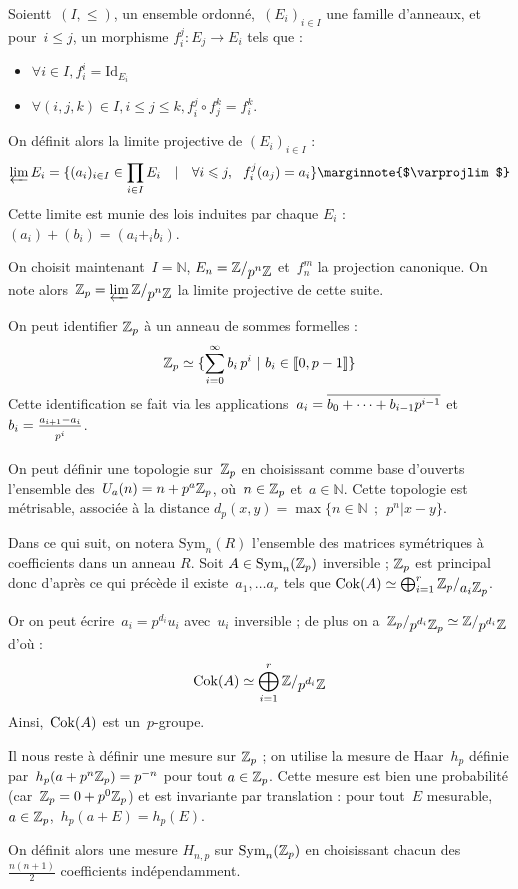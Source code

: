 \begin{defi}
Soientt~$(I, \leq)$, un ensemble ordonné,~$(E_i)_{i\in I}$ une famille d'anneaux, et pour~$i\leq j$, un morphisme $f_i^j : E_j \to E_i$ tels que :
\begin{itemize}
\item $\forall i\in I, f_i^i = \text{Id}_{E_i}$
\item $\forall (i,j,k)\in I, i\leq j\leq k, f_i^j \circ f_j^k = f_i^k$.
\end{itemize}
On définit alors la limite projective de $(E_i)_{i\in I}$ :
\[ \varprojlim{E_i} = \{(a_i)_{i\in I}\in \prod_{i\in I}{E_i}\quad |\quad\forall i\leq j,\ \  f_i^j(a_j) = a_i \} \text{\marginnote{$\varprojlim$}} \]
Cette limite est munie des lois induites par chaque $E_i$ : $(a_i) + (b_i) = (a_i +_i b_i)$.
\end{defi}

On choisit maintenant~$I = \mathbb N$, $E_n = \quotient{\mathbb{Z}}{p^n \mathbb Z}$ et~$f_n^m$ la projection canonique. On note alors~$\Zp = \varprojlim{\quotient{\mathbb Z}{p^n\mathbb Z}}$ la limite projective de cette suite. \marginnote{$\Zp$}

\begin{rem}
On peut identifier $\Zp$ à un anneau de sommes formelles :
\[ \mathbb{Z}_p \simeq \{ \sum_{i=0}^\infty{b_i\,p^i}\   |\  b_i\in\llbracket0, p-1 \rrbracket\} \]
Cette identification se fait via les applications~$a_i = \overline{\strut b_0+\dots+b_{i-1}p^{i-1}}$ et~$b_i = \frac{a_{i+1}-a_i}{\strut p^i}$.
\end{rem}

On peut définir une topologie sur~$\Zp$ en choisissant comme base d'ouverts l'ensemble des~$U_a(n) = n + p^a\mathbb{Z}_p$, où~$n\in\mathbb{Z}_p$ et~$a\in\mathbb N$. Cette topologie est métrisable, associée à la distance $d_p(x,y) = \max\{n\in\mathbb N \ \ ;\  \ p^n | x-y\}$.

\vspace{0.2cm}
Dans ce qui suit, on notera $\text{Sym}_n(R)$ l'ensemble des matrices symétriques à coefficients dans un anneau $R$.
Soit $A \in \operatorname{Sym}_n(\mathbb{Z}_p)$ inversible ; $\Zp$ est principal donc d'après ce qui précède il existe~$a_1, \dots a_r$ tels que $\Cok(A) \simeq \bigoplus_{i=1}^r{\quotient{\Zp}{a_i\Zp}}$.

Or on peut écrire~$a_i = p^{d_i}u_i$ avec~$u_i$ inversible ; de plus on a~$\quotient{\Zp}{p^{d_i}\Zp} \simeq \quotient{\mathbb Z}{p^{d_i}\mathbb Z}$ d'où :
\[ \Cok(A) \simeq \bigoplus_{i=1}^r \quotient{\mathbb Z}{p^{d_i}\mathbb Z} \]
Ainsi,~$\operatorname{Cok}(A)$ est un~$p$-groupe.

Il nous reste à définir une mesure sur $\Zp$ ; on utilise la mesure de Haar~$h_p$ définie par~$h_p(a+p^n\mathbb{Z}_p) = p^{-n}$ pour tout $a\in\mathbb{Z}_p$.
Cette mesure est bien une probabilité (car~$\mathbb{Z}_p = 0+p^0\mathbb{Z}_p$) et est invariante par translation : pour tout~$E$ mesurable,~$a\in\mathbb{Z}_p$,~$h_p(a+E)=h_p(E)$.

On définit alors une mesure $H_{n,p}$ sur $\operatorname{Sym}_n(\mathbb{Z}_p)$ en choisissant chacun des $\frac{n(n+1)}2$ coefficients indépendamment.